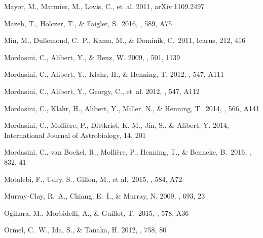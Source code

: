 \documentclass[]{emulateapj}
\begin{document}
\begin{thebibliography}{}
{Mayor}, M., {Marmier}, M., {Lovis}, C., {et~al.} 2011, arXiv:1109.2497
  
 Mazeh, T., Holczer, T., \& Faigler, S.\ 2016, \aap, 589, A75 
  
  
 Min, M., Dullemond, C.~P., Kama, M., \& Dominik, C.\ 2011, Icarus, 212, 416 


{Mordasini}, C., {Alibert}, Y., \& {Benz}, W. 2009, \aap, 501, 1139

{Mordasini}, C., {Alibert}, Y., {Klahr}, H., \& {Henning}, T.
  2012{}, \aap, 547, A111

{Mordasini}, C., {Alibert}, Y., {Georgy}, C., {et~al.} 2012{},
  \aap, 547, A112
 
 Mordasini, C., Klahr, H., Alibert, Y., Miller, N., \& Henning, T.\ 2014, \aap, 566, A141 

{Mordasini}, C., {Molli{\`e}re}, P., {Dittkrist}, K.-M., {Jin}, S., \&
  {Alibert}, Y. 2014, International Journal of Astrobiology, 14, 201 

 Mordasini, C., van Boekel, R., Molli{\`e}re, P., Henning, T., \& Benneke, B.\ 2016, \apj, 832, 41 

 Motalebi, F., Udry, S., Gillon, M., et al.\ 2015, \aap, 584, A72 


{Murray-Clay}, R.~A., {Chiang}, E.~I., \& {Murray}, N. 2009, \apj, 693, 23

 Ogihara, M., Morbidelli, A., \& Guillot, T.\ 2015, \aap, 578, A36 

{Ormel}, C.~W., {Ida}, S., \& {Tanaka}, H. 2012, \apj, 758, 80


\end{thebibliography}
\end{document}
